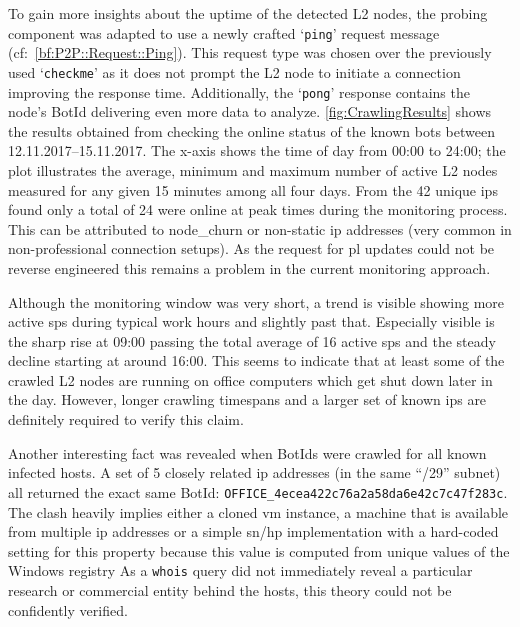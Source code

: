 To gain more insights about the uptime of the detected L2 nodes, the probing component was adapted to use a newly crafted `\lstinline|ping|' request message (cf:~\autoref{bf:P2P::Request::Ping}).
This request type was chosen over the previously used `\lstinline|checkme|' as it does not prompt the L2 node to initiate a connection improving the response time.
Additionally, the `\lstinline|pong|' response contains the node's BotId delivering even more data to analyze.
\autoref{fig:CrawlingResults} shows the results obtained from checking the online status of the known bots between 12.11.2017--15.11.2017.
The x-axis shows the time of day from 00:00 to 24:00; the plot illustrates the average, minimum and maximum number of active L2 nodes measured for any given 15 minutes among all four days.
From the 42 unique \glspl{ip} found only a total of 24 were online at peak times during the monitoring process.
This can be attributed to \gls{node_churn} or non-static \gls{ip} addresses (very common in non-professional connection setups).
As the request for \gls{pl} updates could not be reverse engineered this remains a problem in the current monitoring approach.

Although the monitoring window was very short, a trend is visible showing more active \glspl{sp} during typical work hours and slightly past that.
Especially visible is the sharp rise at 09:00 passing the total average of 16 active \glspl{sp} and the steady decline starting at around 16:00.
This seems to indicate that at least some of the crawled L2 nodes are running on office computers which get shut down later in the day.
However, longer crawling timespans and a larger set of known \glspl{ip} are definitely required to verify this claim.

Another interesting fact was revealed when BotIds were crawled for all known infected hosts.
A set of 5 closely related \gls{ip} addresses (in the same ``/29'' subnet) all returned the exact same BotId: \lstinline|OFFICE_4ecea422c76a2a58da6e42c7c47f283c|.
The clash heavily implies either a cloned \gls{vm} instance, a machine that is available from multiple \gls{ip} addresses or a simple \gls{sn}/\gls{hp} implementation with a hard-coded setting for this property because this value is computed from unique values of the Windows registry 
As a \lstinline|whois| query did not immediately reveal a particular research or commercial entity behind the hosts, this theory could not be confidently verified.


